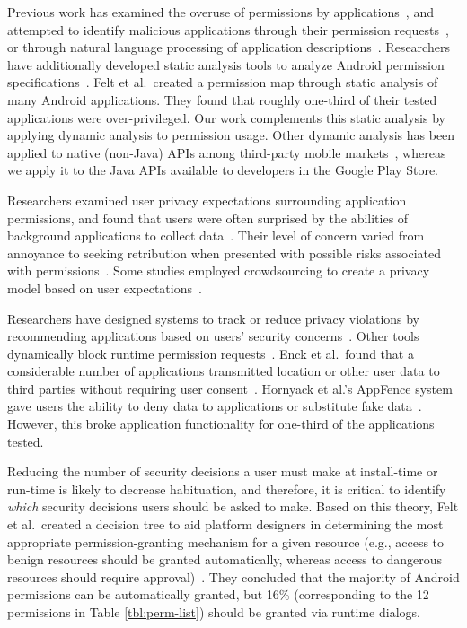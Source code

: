 \documentclass[letterpaper,twocolumn,10pt]{article}
\begin{document}
Previous work has examined the overuse of permissions by applications~\cite{Felt2011b, Gorla2014}, and attempted to identify malicious applications through their permission requests~\cite{Sarma2012}, or through natural language processing of application descriptions~\cite{Pandita2013}. Researchers have additionally developed static analysis tools to analyze Android permission specifications~\cite{Felt2011b, Au2012, Bodden2013}. Felt et al.\ created a permission map through static analysis of many Android applications. They found that roughly one-third of their tested applications were over-privileged. Our work complements this static analysis by applying dynamic analysis to permission usage. Other dynamic analysis has been applied to native (non-Java) APIs among third-party mobile markets~\cite{Spreitzenbarth2013}, whereas we apply it to the Java APIs available to developers in the Google Play Store.

Researchers examined user privacy expectations surrounding application permissions, and found that users were often surprised by the abilities of background applications to collect data~\cite{Jung2012, Thompson2013}. Their level of concern varied from annoyance to seeking retribution when presented with possible risks associated with permissions~\cite{Felt2012c}. Some studies employed crowdsourcing to create a privacy model based on user expectations~\cite{Lin2012}.

Researchers have designed systems to track or reduce privacy violations by recommending applications based on users' security concerns~\cite{Enck2010, Hornyack2011, Zhu2014, Gibler2012, Klieber2014, Xu2012, Almohri2014, Zhang2013}. Other tools dynamically block runtime permission requests~\cite{Shebaro2014}. Enck et al.\ found that a considerable number of applications transmitted location or other user data to third parties without requiring user consent~\cite{Enck2010}. Hornyack et al.'s AppFence system gave users the ability to deny data to applications or substitute fake data~\cite{Hornyack2011}. However, this broke application functionality for one-third of the applications tested.

Reducing the number of security decisions a user must make at install-time or run-time is likely to decrease habituation, and therefore, it is critical to identify {\it which} security decisions users should be asked to make. Based on this theory, Felt et al.\ created a decision tree to aid platform designers in determining the most appropriate permission-granting mechanism for a given resource (e.g., access to benign resources should be granted automatically, whereas access to dangerous resources should require approval)~\cite{Felt2012b}. They concluded that the majority of Android permissions can be automatically granted, but 16\% (corresponding to the 12 permissions in Table \ref{tbl:perm-list}) should be granted via runtime dialogs.
\end{document}
